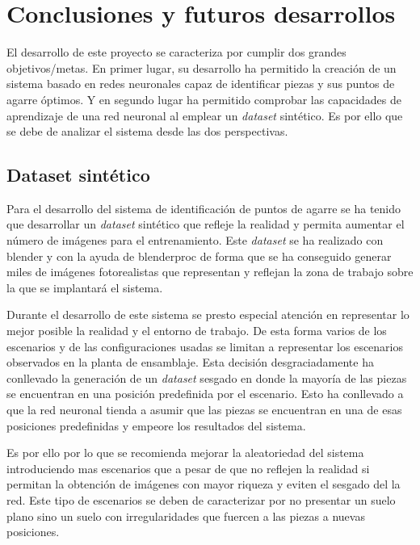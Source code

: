\chapter{Conclusiones y futuros desarrollos}
\label{chap:Conclusiones y futuros desarrollos}
El desarrollo de este proyecto se caracteriza por cumplir dos grandes objetivos/metas. En primer lugar, su desarrollo ha permitido la creación de un sistema basado en redes neuronales capaz de identificar piezas y sus puntos de agarre óptimos. Y en segundo lugar ha permitido comprobar las capacidades de aprendizaje de una red neuronal al emplear un \textit{dataset} sintético. Es por ello que se debe de analizar el sistema desde las dos perspectivas.

\section{Dataset sintético}
\label{chap:Conclusiones sec:Dataset sintético}
Para el desarrollo del sistema de identificación de puntos de agarre se ha tenido que desarrollar un \textit{dataset} sintético que refleje la realidad y permita aumentar el número de imágenes para el entrenamiento. Este \textit{dataset} se ha realizado con blender y con la ayuda de blenderproc de forma que se ha conseguido generar miles de imágenes fotorealistas que representan y reflejan la zona de trabajo sobre la que se implantará el sistema.

Durante el desarrollo de este sistema se presto especial atención en representar lo mejor posible la realidad y el entorno de trabajo. De esta forma varios de los escenarios y de las configuraciones usadas se limitan a representar los escenarios observados en la planta de ensamblaje. Esta decisión desgraciadamente ha conllevado la generación de un \textit{dataset} sesgado en donde la mayoría de las piezas se encuentran en una posición predefinida por el escenario. Esto ha conllevado a que la red neuronal tienda a asumir que las piezas se encuentran en una de esas posiciones predefinidas y empeore los resultados del sistema.

Es por ello por lo que se recomienda mejorar la aleatoriedad del sistema introduciendo mas escenarios que a pesar de que no reflejen la realidad si permitan la obtención de imágenes con mayor riqueza y eviten el sesgado del la red. Este tipo de escenarios se deben de caracterizar por no presentar un suelo plano sino un suelo con irregularidades que fuercen a las piezas a nuevas posiciones.

